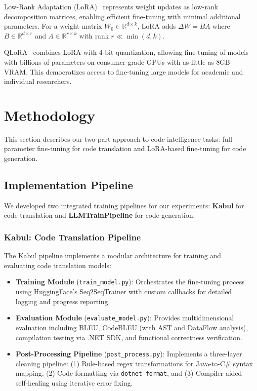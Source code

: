 \documentclass[conference]{IEEEtran}
\begin{document}
Low-Rank Adaptation (LoRA)~\cite{hu2021lora} represents weight updates as low-rank decomposition matrices, enabling efficient fine-tuning with minimal additional parameters. For a weight matrix $W_0 \in \mathbb{R}^{d \times k}$, LoRA adds $\Delta W = BA$ where $B \in \mathbb{R}^{d \times r}$ and $A \in \mathbb{R}^{r \times k}$ with rank $r \ll \min(d, k)$.

QLoRA~\cite{dettmers2023qlora} combines LoRA with 4-bit quantization, allowing fine-tuning of models with billions of parameters on consumer-grade GPUs with as little as 8GB VRAM. This democratizes access to fine-tuning large models for academic and individual researchers.

\section{Methodology}

This section describes our two-part approach to code intelligence tasks: full parameter fine-tuning for code translation and LoRA-based fine-tuning for code generation.

\subsection{Implementation Pipeline}

We developed two integrated training pipelines for our experiments: \textbf{Kabul} for code translation and \textbf{LLMTrainPipeline} for code generation.

\subsubsection{Kabul: Code Translation Pipeline}
The Kabul pipeline implements a modular architecture for training and evaluating code translation models:

\begin{itemize}
    \item \textbf{Training Module} (\texttt{train\_model.py}): Orchestrates the fine-tuning process using HuggingFace's Seq2SeqTrainer with custom callbacks for detailed logging and progress reporting.
    \item \textbf{Evaluation Module} (\texttt{evaluate\_model.py}): Provides multidimensional evaluation including BLEU, CodeBLEU (with AST and DataFlow analysis), compilation testing via .NET SDK, and functional correctness verification.
    \item \textbf{Post-Processing Pipeline} (\texttt{post\_process.py}): Implements a three-layer cleaning pipeline: (1) Rule-based regex transformations for Java-to-C\# syntax mapping, (2) Code formatting via \texttt{dotnet format}, and (3) Compiler-aided self-healing using iterative error fixing.
\end{itemize}
\end{document}
